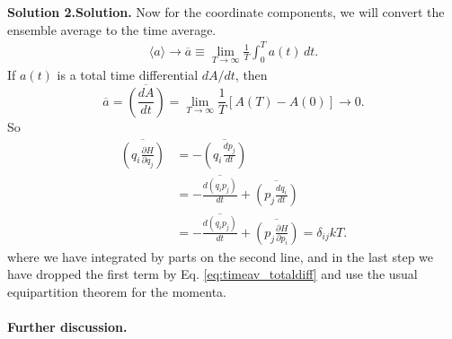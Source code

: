 \documentclass[twocolumn, 10pt]{article}
\numberwithin{equation}{section}
\newenvironment{solution}[1][\empty]
{\par\medskip\sffamily
  \textbf{\ifx\empty#1{Solution.}\relax\else{#1}\fi} \ignorespaces}
{\medskip}
\begin{document}
\begin{solution}[Solution 2.]
Now for the coordinate components,
we will convert the ensemble average to the time average.
\begin{align*}
  \langle a \rangle
  \to
  \overline a
  \equiv
  \lim_{T\to\infty}
  \frac{1}{T}\int_0^T a(t) \, dt
  .
\end{align*}
%
If $a(t)$ is a total time differential $dA/dt$, then
\begin{equation}
  \overline a
  =
  \overline{ \left( \frac{ dA}{dt} \right) }
  =\lim_{T\to\infty} \frac{1}{T} \left[ A(T) - A(0) \right]
  \to 0.
  \label{eq:timeav_totaldiff}
\end{equation}
%
So
\begin{align*}
  \overline{\left( q_i \frac{ \partial H } { \partial q_j } \right)}
  &=
  -\overline{\left( q_i \frac{ d p_j } { dt } \right)}
  \\
  &=
  -\overline{\frac{ d (q_i p_j) } { dt } }
  +\overline{\left( p_j \frac{ d q_i } { dt }  \right)}
  \\
  &=
  -\overline{\frac{ d (q_i p_j) } { dt } }
  +\overline{\left( p_j \frac{ \partial H } { \partial p_i } \right)}
  =
  \delta_{ij} kT.
\end{align*}
where
we have integrated by parts on the second line,
and in the last step we have dropped the first term
by Eq. \eqref{eq:timeav_totaldiff}
and use the usual equipartition theorem
for the momenta.
\end{solution}


\paragraph*{Further discussion.}
\end{document}
